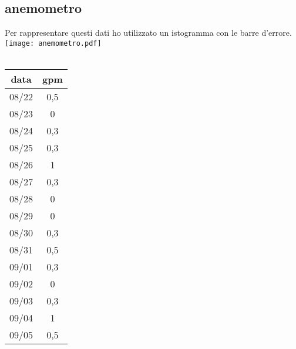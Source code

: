 \documentclass[12pt]{article}
\begin{document}
\subsection{anemometro}
Per rappresentare questi dati ho utilizzato un istogramma con le barre d'errore.
\texttt{[image: anemometro.pdf]} \\\\
\begin{tabular}{|c|c|}
    \hline
    data & gpm \\
    \hline
     08/22 &  0,5\\
     08/23 &  0\\
     08/24 &  0,3\\
     08/25 &  0,3\\
     08/26 &  1\\
     08/27 &  0,3\\
     08/28 &  0\\
     08/29 &  0\\
     08/30 &  0,3\\
     08/31 &  0,5\\
     09/01 &  0,3\\
     09/02 &  0\\
     09/03 &  0,3\\
     09/04 &  1\\
     09/05 &  0,5\\
     \hline
\end{tabular} \\
\end{document}
